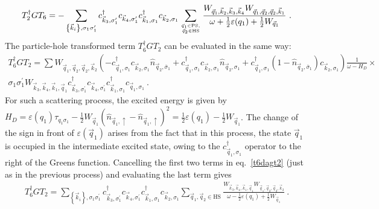\documentclass{revtex4-2}
\begin{document}
\begin{equation}\begin{aligned}\label{t2t61}
	T_2^\dagger G T_6 = -\sum_{\left\{\vec k_i\right\}, \sigma_1\sigma_1^\prime}  c^\dagger_{\vec k_3,\sigma_1^\prime}c_{\vec k_4,\sigma_1^\prime} c^\dagger_{\vec k_1,\sigma_1} c_{\vec k_2,\sigma_1}\sum_{\vec q_1\in\text{PS},\atop{\vec q_2 \in \text{HS}}}\frac{W_{\vec q_1,\vec k_2,\vec k_3,\vec k_4} W_{\vec q_1,\vec q_2,\vec q_2,\vec k_1}}{\omega + \frac{1}{2}\varepsilon(q_1) + \frac{1}{2}W_{\vec q_1}}  ~.
\end{aligned}\end{equation}
The particle-hole transformed term \(T_6^\dagger G T_2\) can be evaluated in the same way:
\begin{equation}\begin{aligned}\label{t6dagt2}
	T_6^\dagger G T_2 = \sum W_{\vec q_1,\vec q_2,\vec q_2,\vec k_2}\left(-c^\dagger_{\vec q_1,\sigma_1}c_{\vec k_2,\sigma_1}\hat n_{\vec q_2,\bar\sigma_1} + c^\dagger_{\vec q_1,\sigma_1}c_{\vec k_2,\sigma_1}\hat n_{\vec q_2,\sigma_1} + c^\dagger_{\vec q_1,\sigma_1}\left(1 - \hat n_{\vec q_2,\bar\sigma_1}\right) c_{\vec k_2,\sigma_1}\right) \frac{1}{\omega - H_D}\times \\
	\sigma_1\sigma_1^\prime W_{\vec k_3,\vec k_4,\vec k_1,\vec q_1} c^\dagger_{\vec k_3, \sigma_1^\prime}c_{\vec k_4,\sigma_1^\prime}c^\dagger_{\vec k_1,\sigma_1}c_{\vec q_1,\sigma_1} ~.
\end{aligned}\end{equation}
For such a scattering process, the excited energy is given by \(H_D = \varepsilon(q_1)\tau_{q_1\sigma_1} - \frac{1}{2}W_{\vec q_1}\left(\hat n_{\vec q_1, \uparrow} - \hat n_{\vec q_1, \uparrow}\right)^2 = \frac{1}{2}\varepsilon(q_1) - \frac{1}{2}W_{\vec q_1}\). The change of the sign in front of \(\varepsilon(\vec q_1)\) arises from the fact that in this process, the state \(\vec q_1\) is occupied in the intermediate excited state, owing to the \(c^\dagger_{\vec q_1,\sigma_1}\) operator to the right of the Greens function. Cancelling the first two terms in eq.~\ref{t6dagt2} (just as in the previous process) and evaluating the last term gives
\begin{equation}\begin{aligned}\label{t2t62}
	T_6^\dagger G T_2 = \sum_{\left\{\vec k_i\right\}, \sigma_1\sigma_1^\prime}  c^\dagger_{\vec k_3, \sigma_1^\prime}c_{\vec k_4,\sigma_1^\prime}c^\dagger_{\vec k_1,\sigma_1} c_{\vec k_2,\sigma_1}\sum_{\vec q_1, \vec q_2\in\text{HS}}\frac{W_{\vec k_3,\vec k_4,\vec k_1,\vec q_1} W_{\vec q_1,\vec q_2,\vec q_2,\vec k_2}}{\omega - \frac{1}{2}\varepsilon(q_1) + \frac{1}{2}W_{\vec q_1}}~.
\end{aligned}\end{equation}
\end{document}
